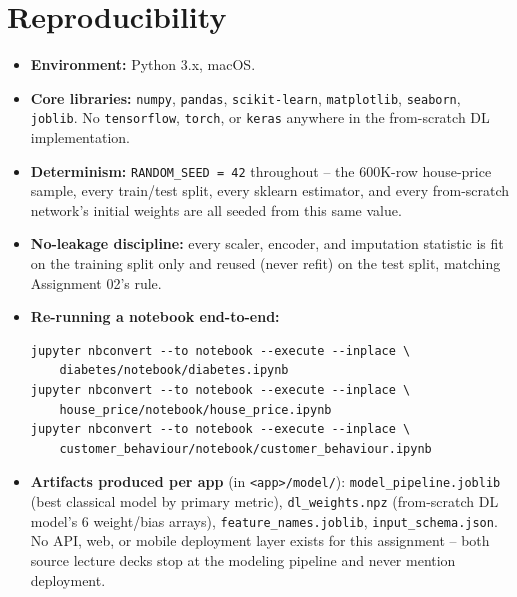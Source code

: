 \documentclass[11pt, a4paper]{article}
\begin{document}
\section{Reproducibility}

\begin{itemize}
    \item \textbf{Environment:} Python 3.x, macOS.
    \item \textbf{Core libraries:} \texttt{numpy}, \texttt{pandas}, \texttt{scikit-learn},
    \texttt{matplotlib}, \texttt{seaborn}, \texttt{joblib}. No \texttt{tensorflow},
    \texttt{torch}, or \texttt{keras} anywhere in the from-scratch DL implementation.
    \item \textbf{Determinism:} \texttt{RANDOM\_SEED = 42} throughout -- the 600K-row
    house-price sample, every train/test split, every sklearn estimator, and every
    from-scratch network's initial weights are all seeded from this same value.
    \item \textbf{No-leakage discipline:} every scaler, encoder, and imputation statistic
    is fit on the training split only and reused (never refit) on the test split, matching
    Assignment 02's rule.
    \item \textbf{Re-running a notebook end-to-end:}
\begin{lstlisting}
jupyter nbconvert --to notebook --execute --inplace \
    diabetes/notebook/diabetes.ipynb
jupyter nbconvert --to notebook --execute --inplace \
    house_price/notebook/house_price.ipynb
jupyter nbconvert --to notebook --execute --inplace \
    customer_behaviour/notebook/customer_behaviour.ipynb
\end{lstlisting}
    \item \textbf{Artifacts produced per app} (in \texttt{<app>/model/}):
    \texttt{model\_pipeline.joblib} (best classical model by primary metric),
    \texttt{dl\_weights.npz} (from-scratch DL model's 6 weight/bias arrays),
    \texttt{feature\_names.joblib}, \texttt{input\_schema.json}. No API, web, or mobile
    deployment layer exists for this assignment -- both source lecture decks stop at the
    modeling pipeline and never mention deployment.
\end{itemize}
\end{document}
